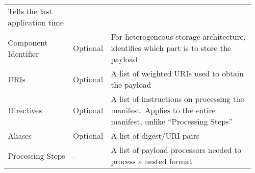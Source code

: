 \documentclass[0-thesis.tex]{subfiles}
\begin{document}
\begin{longtable}[]{@{}lll@{}}
\begin{minipage}[t]{0.60\columnwidth}
    Tells the last application time\strut
    \end{minipage}\tabularnewline
    \begin{minipage}[t]{0.23\columnwidth}\raggedright\strut
    Component Identifier\strut
    \end{minipage} & \begin{minipage}[t]{0.26\columnwidth}\raggedright\strut
    Optional\strut
    \end{minipage} & \begin{minipage}[t]{0.60\columnwidth}\raggedright\strut
    For heterogeneous storage architecture, identifies which part is to store the
    payload\strut
    \end{minipage}\tabularnewline
    \begin{minipage}[t]{0.23\columnwidth}\raggedright\strut
    URIs\strut
    \end{minipage} & \begin{minipage}[t]{0.26\columnwidth}\raggedright\strut
    Optional\strut
    \end{minipage} & \begin{minipage}[t]{0.60\columnwidth}\raggedright\strut
    A list of weighted URIs used to obtain the payload\strut
    \end{minipage}\tabularnewline
    \begin{minipage}[t]{0.23\columnwidth}\raggedright\strut
    Directives\strut
    \end{minipage} & \begin{minipage}[t]{0.26\columnwidth}\raggedright\strut
    Optional\strut
    \end{minipage} & \begin{minipage}[t]{0.60\columnwidth}\raggedright\strut
    A list of instructions on processing the manifest. Applies to the entire
    manifest, unlike ``Processing Steps''\strut
    \end{minipage}\tabularnewline
    \begin{minipage}[t]{0.23\columnwidth}\raggedright\strut
    Aliases\strut
    \end{minipage} & \begin{minipage}[t]{0.26\columnwidth}\raggedright\strut
    Optional\strut
    \end{minipage} & \begin{minipage}[t]{0.60\columnwidth}\raggedright\strut
    A list of digest/URI pairs\strut
    \end{minipage}\tabularnewline
    \begin{minipage}[t]{0.23\columnwidth}\raggedright\strut
    Processing Steps\strut
    \end{minipage} & \begin{minipage}[t]{0.26\columnwidth}\raggedright\strut
    -\strut
    \end{minipage} & \begin{minipage}[t]{0.60\columnwidth}\raggedright\strut
    A list of payload processors needed to process a nested format\strut
    \end{minipage}\tabularnewline
    \bottomrule
\end{longtable}
\end{document}
